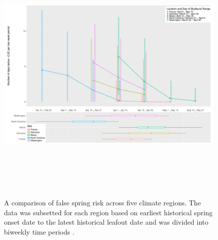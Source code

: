 \documentclass{article}\usepackage[]{graphicx}\usepackage[]{color}
\begin{document}
\begin{figure} [H] 
\begin{center}
\includegraphics[width=16cm, height=13cm]{..//figure/RegionalRisk.pdf} 
\caption{A comparison of false spring risk across five climate regions. The data was subsetted for each region based on earliest historical spring onset date to the latest historical leafout date and was divided into biweekly time periods \citep{Schaber2005, White2009, Soudani2012, USA-NPN2016}.}\label{fig:regional} 
\end{center}
\end{figure}


\end{document}
